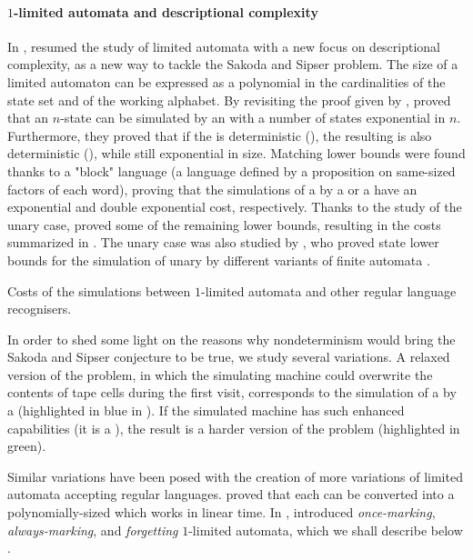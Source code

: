 \paragraph{$1$-limited automata and descriptional complexity}
In \citeyear{PigPis14}, \citeauthor{PigPis14} resumed the study of limited automata with a new focus on descriptional complexity, as a new way to tackle the Sakoda and Sipser problem.
The size of a limited automaton can be expressed as a polynomial in the cardinalities of the state set and of the working alphabet.
By revisiting the proof given by \citeauthor{WagWec86}, \citeauthor{PigPis14} proved that an $n$-state \OLA can be simulated by an \NFA with a number of states exponential in $n$.
Furthermore, they proved that if the \OLA is deterministic (\ODLA), the resulting \NFA is also deterministic (\DFA), while still exponential in size.
Matching lower bounds were found thanks to a "block" language (a language defined by a proposition on same-sized factors of each word), proving that the simulations of a \OLA by a \NFA or a \DFA have an exponential and double exponential cost, respectively.
Thanks to the study of the unary case, \citeauthor{PigPri19} proved some of the remaining lower bounds, resulting in the costs summarized in  \cite{PigPri19}.
The unary case was also studied by \citeauthor{KutWen15}, who proved state lower bounds for the simulation of unary \kLA by different variants of finite automata \cite{KutWen15}.

\begin{table}
	\centering
	
	\caption{Costs of the simulations between $1$-limited automata and other regular language recognisers.}
	\label{tab:sims-1la-general-context}
\end{table}

In order to shed some light on the reasons why nondeterminism would bring the Sakoda and Sipser conjecture to be true, we study several variations.
A relaxed version of the problem, in which the simulating machine could overwrite the contents of tape cells during the first visit, corresponds to the simulation of a \TNFA by a \ODLA (highlighted in blue in ).
If the simulated machine has such enhanced capabilities (\ie it is a \OLA), the result is a harder version of the problem (highlighted in green).

Similar variations have been posed with the creation of more variations of limited automata accepting regular languages.
\citeauthor{GuiPri19} proved that each \OLA can be converted into a polynomially-sized \OLA which works in linear time.
In \citeyear{PigPri23a}, \citeauthor{PigPri23a} introduced \emph{once-marking}, \emph{always-marking}, and \emph{forgetting} $1$-limited automata, which we shall describe below \cite{PigPri23a,PigPri23}.


